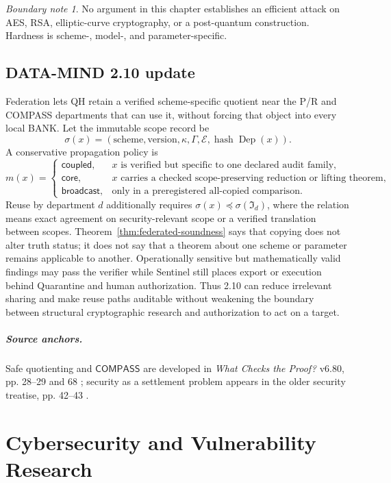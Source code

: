 \documentclass[11pt,oneside]{book}
\theoremstyle{definition}
\theoremstyle{remark}
\newtheorem{boundary}[theorem]{Boundary note}
\newcommand{\COMPASS}{\mathsf{COMPASS}}
\newcommand{\Dep}{\operatorname{Dep}}
\begin{document}
\begin{boundary}
No argument in this chapter establishes an efficient attack on AES, RSA, elliptic-curve cryptography,
or a post-quantum construction. Hardness is scheme-, model-, and parameter-specific.
\end{boundary}

\section{DATA-MIND 2.10 update}
Federation lets QH retain a verified scheme-specific quotient near the P/R and COMPASS departments
that can use it, without forcing that object into every local BANK. Let the immutable scope record be
\[
\sigma(x)=(\text{scheme},\text{version},\kappa,\Gamma,\mathcal E,
\operatorname{hash}\Dep(x)).
\]
A conservative propagation policy is
\[
m(x)=
\begin{cases}
\mathsf{coupled}, & x\text{ is verified but specific to one declared audit family},\\
\mathsf{core}, & x\text{ carries a checked scope-preserving reduction or lifting theorem},\\
\mathsf{broadcast}, & \text{only in a preregistered all-copied comparison}.
\end{cases}
\]
Reuse by department \(d\) additionally requires \(\sigma(x)\preceq\sigma(\mathfrak I_d)\), where
the relation means exact agreement on security-relevant scope or a verified translation between
scopes. Theorem~\ref{thm:federated-soundness} says that copying does not alter truth status; it does
not say that a theorem about one scheme or parameter remains applicable to another. Operationally
sensitive but mathematically valid findings may pass the verifier while Sentinel still places export
or execution behind Quarantine and human authorization. Thus 2.10 can reduce irrelevant sharing and
make reuse paths auditable without weakening the boundary between structural cryptographic research
and authorization to act on a target.

\paragraph{Source anchors.} Safe quotienting and \(\COMPASS\) are developed in
\emph{What Checks the Proof?} v6.80, pp. 28--29 and 68 \cite{TennesonChecks}; security as a
settlement problem appears in the older security treatise, pp. 42--43 \cite{TennesonSecurity}.

\chapter{Cybersecurity and Vulnerability Research}
\label{ch:vulnerability}
\end{document}
